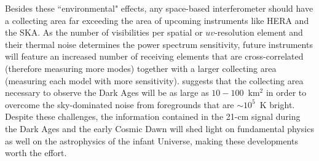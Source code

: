 Besides these ``environmental" effects, any space-based interferometer should have a collecting area far exceeding the area of upcoming instruments like HERA and the SKA. 
As the number of visibilities per spatial or $uv$-resolution element and their thermal noise determines the power spectrum sensitivity, future instruments will feature an increased number of receiving elements that are cross-correlated (therefore measuring more modes) together with a larger collecting area (measuring each model with more sensitivity). \cite{koopmans19} suggests that the collecting area necessary to observe the Dark Ages will be as large as $10-100$~km$^2$ in order to overcome the sky-dominated noise from foregrounds that are $\sim 10^5$~K bright. Despite these challenges, the information contained in the 21-cm signal during the Dark Ages and the early Cosmic Dawn will shed light on fundamental physics as well on the astrophysics of the infant Universe, making these developments worth the effort.     


